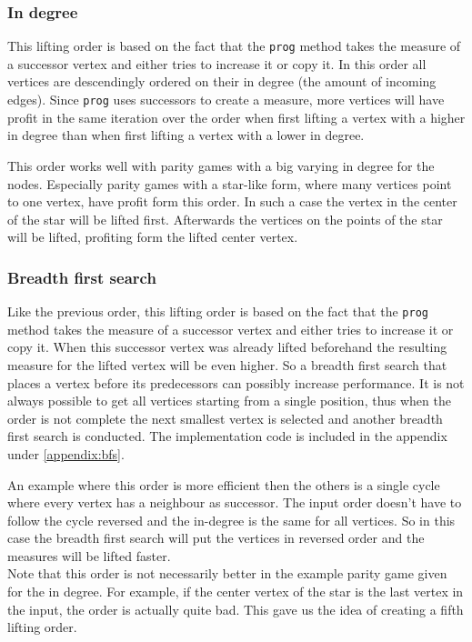 \documentclass[10pt,a4paper]{article}
\begin{document}
\subsubsection{In degree}\label{indegree}
This lifting order is based on the fact that the \texttt{prog} method takes the measure of a successor vertex and either tries to increase it or copy it. In this order all vertices are descendingly ordered on their in degree (the amount of incoming edges). Since \texttt{prog} uses successors to create a measure, more vertices will have profit in the same iteration over the order when first lifting a vertex with a higher in degree than when first lifting a vertex with a lower in degree.


This order works well with parity games with a big varying in degree for the nodes. Especially parity games with a star-like form, where many vertices point to one vertex, have profit form this order. In such a case the vertex in the center of the star will be lifted first. Afterwards the vertices on the points of the star will be lifted, profiting form the lifted center vertex.

\subsubsection{Breadth first search}
Like the previous order, this lifting order is based on the fact that the \texttt{prog} method takes the measure of a successor vertex and either tries to increase it or copy it. When this successor vertex was already lifted beforehand the resulting measure for the lifted vertex will be even higher. So a breadth first search that places a vertex before its predecessors can possibly increase performance. It is not always possible to get all vertices starting from a single position, thus when the order is not complete the next smallest vertex is selected and another breadth first search is conducted. The implementation code is included in the appendix under \ref{appendix:bfs}.

An example where this order is more efficient then the others is a single cycle where every vertex has a neighbour as successor. The input order doesn't have to follow the cycle reversed and the in-degree is the same for all vertices. So in this case the breadth first search will put the vertices in reversed order and the measures will be lifted faster.\\
Note that this order is not necessarily better in the example parity game given for the in degree. For example, if the center vertex of the star is the last vertex in the input, the order is actually quite bad. This gave us the idea of creating a fifth lifting order.
\end{document}
